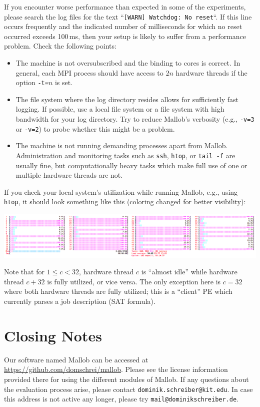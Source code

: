 \documentclass[runningheads]{article}
\numberwithin{dummy}{subsection}
\begin{document}
If you encounter worse performance than expected in some of the experiments, please search the log files for the text ``\texttt{[WARN] Watchdog: No reset}``.
If this line occurs frequently and the indicated number of milliseconds for which no reset occurred exceeds 100\,ms, then your setup is likely to suffer from a performance problem.
Check the following points:
\begin{itemize}
\item The machine is not oversubscribed and the binding to cores is correct. In general, each MPI process should have access to $2n$ hardware threads if the option \texttt{-t=}$n$ is set.
\item The file system where the log directory resides allows for sufficiently fast logging. If possible, use a local file system or a file system with high bandwidth for your log directory. Try to reduce Mallob's verbosity (e.g., \texttt{-v=3} or \texttt{-v=2}) to probe whether this might be a problem.
\item The machine is not running demanding processes apart from Mallob.
Administration and monitoring tasks such as \texttt{ssh}, \texttt{htop}, or \texttt{tail -f} are usually fine, but computationally heavy tasks which make full use of one or multiple hardware threads are not.
\end{itemize}

If you check your local system's utilization while running Mallob, e.g., using \texttt{htop}, it should look something like this (coloring changed for better visibility):
\begin{center}
\includegraphics[width=\textwidth]{../sample-output/htop-32cores.png}
\end{center}
Note that for $1 \leq c < 32$, hardware thread $c$ is ``almost idle'' while hardware thread $c+32$ is fully utilized, or vice versa.
The only exception here is $c=32$ where both hardware threads are fully utilized; this is a ``client'' PE which currently parses a job description (SAT formula).


\section{Closing Notes}

Our software named Mallob can be accessed at \url{https://github.com/domschrei/mallob}.
Please see the license information provided there for using the different modules of Mallob.
If any questions about the evaluation process arise, please contact \texttt{dominik.schreiber@kit.edu}.
In case this address is not active any longer, please try \texttt{mail@dominikschreiber.de}.



%
%
%
%
%
%
\end{document}
